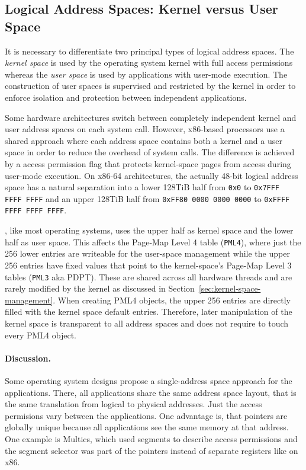\subsection{Logical Address Spaces: Kernel versus User Space}
\label{sec:address-space-phys}

It is necessary to differentiate two principal types of logical address spaces. The \emph{kernel space} is used by the operating system kernel with full access permissions whereas the \emph{user space} is used by applications with user-mode execution. The construction of user spaces is supervised and restricted by the kernel in order to enforce isolation and protection between independent applications. 

Some hardware architectures switch between completely independent kernel and user address spaces on each system call. However, x86-based processors use a shared approach where each address space contains both a kernel and a user space in order to reduce the overhead of system calls. The difference is achieved by a access permission flag that protects kernel-space pages from access during user-mode execution. On x86-64 architectures, the actually 48-bit logical address space has a natural separation into a lower 128TiB half from \texttt{0x0} to \texttt{0x7FFF\,FFFF\,FFFF} and an upper 128TiB half from \texttt{0xFF80\,0000\,0000\,0000} to \texttt{0xFFFF\,FFFF\,FFFF\,FFFF}. 

\mythos, like most operating systems, uses the upper half as kernel space and the lower half as user space. This affects the Page-Map Level 4 table (\texttt{PML4}), where just the 256 lower entries are writeable for the user-space management while the upper 256 entries have fixed values that point to the kernel-space's Page-Map Level 3 tables (\texttt{PML3} aka PDPT). These are shared across all hardware threads and are rarely modified by the kernel as discussed in Section~\ref{sec:kernel-space-management}. When creating PML4 objects, the upper 256 entries are directly filled with the kernel space default entries. Therefore, later manipulation of the kernel space is transparent to all address spaces and does not require to touch every PML4 object.

\paragraph{Discussion.}
Some operating system designs propose a single-address space approach for the applications. There, all applications share the same address space layout, that is the same translation from logical to physical addresses. Just the access permisions vary between the applications. One advantage is, that pointers are globally unique because all applications see the same memory at that address. One example is Multics, which used segments to describe access permissions and the segment selector was part of the pointers instead of separate registers like on x86.


